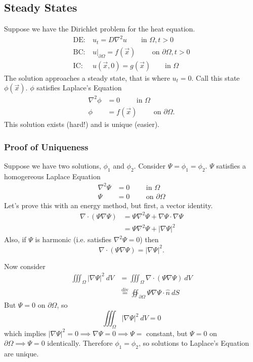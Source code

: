 \documentclass{article}
\newcommand{\x}{\vec{x}}
\newcommand{\nhat}{\hat{n}}
\begin{document}
\subsection{Steady States}
Suppose we have the Dirichlet problem for the heat equation.
\begin{align*}
\text{DE:}&~ u_t = D\nabla^2 u \qquad \text{in } \Omega, t > 0 \\
\text{BC:}&~ u |_{\partial \Omega} = f(\x) \qquad \text{ on } \partial \Omega, t
> 0 \\
\text{IC:}&~ u(\x, 0) = g(\x) \qquad \text{in } \Omega
\end{align*}
The solution approaches a steady state, that is where $u_t = 0$. Call this state
$\phi(\x)$. $\phi$ satisfies Laplace's Equation
\begin{align*}
\nabla^2 \phi &= 0 \qquad \text{ in } \Omega \\
\phi &= f(\x) \qquad \text{ on } \partial \Omega.
\end{align*}
This solution exists (hard!) and is unique (easier).
\subsubsection{Proof of Uniqueness}
Suppose we have two solutions, $\phi_1$ and $\phi_2$. Consider $\Psi = \phi_1 =
\phi_2$. $\Psi$ satisfies a homogereous Laplace Equation
\begin{align*}
\nabla^2 \Psi &= 0 \qquad \text{ in } \Omega \\
\Psi &= 0 \qquad \text{ on } \partial \Omega
\end{align*}
Let's prove this with an energy method, but first, a vector identity.
\begin{align*}
    \nabla \cdot (\Psi \nabla \Psi) &= \Psi \nabla^2 \Psi + \nabla \Psi \cdot
    \nabla \Psi \\
        &= \Psi \nabla^2 \Psi + | \nabla \Psi |^2
\end{align*}
Also, if $\Psi$ is harmonic (i.e. satisfies $\nabla^2 \Psi = 0$) then
\[ \nabla \cdot ( \Psi \nabla \Psi) = | \nabla \Psi |^2.\]

Now consider
\begin{align*}
\iiint_\Omega |\nabla \Psi|^2 ~dV &= \iiint_\Omega \nabla \cdot (\Psi \nabla \Psi)~dV \\
        &\stackrel{\text{div}}{=} \oiint_{\partial \Omega} \Psi \nabla \Psi
        \cdot \nhat~dS
\end{align*}
But $\Psi = 0$ on $\partial \Omega$, so
\[ \iiint_{\Omega} |\nabla \Psi|^2 ~dV = 0\]
which implies $|\nabla \Psi|^2 = 0 \implies \nabla \Psi = 0 \implies \Psi = $
constant, but $\Psi = 0$ on $\partial \Omega \implies \Psi = 0$ identically.
Therefore $\phi_1 = \phi_2$, so solutions to Laplace's Equation are unique.
\end{document}
